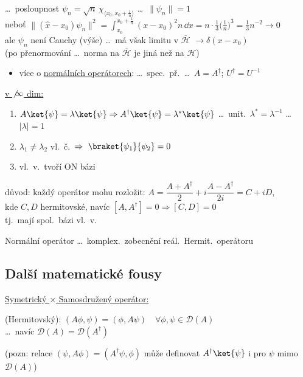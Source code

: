 \begin{priklad}
\dots\ posloupnost \quad $\psi_n = \sqrt n\,\chi_{\langle x_0,x_0+\frac1n\rangle}$ \quad \dots\ $\|\psi_n\| = 1$ \\
neboť \quad $\|(\hat x - x_0)\psi_n\|^2 = \int_{x_0}^{x_0+\frac1n}(x - x_0)^2n\,\dd x = n\cdot\frac13\big(\frac1n\big)^3 = \frac13n^{-2}\to 0$ \\
ale $\psi_n$ není Cauchy (výše) \dots\ má však limitu v $\overline{\mathcal{H}}$ $\to\delta(x - x_0)$ \\
(po přenormování \dots\ norma na $\overline{\mathcal{H}}$ je jiná než na $\mathcal{H}$)
\end{priklad}

\begin{itemize}
  \item více o \underline{normálních operátorech}: \hfill \dots\ spec.\ př.\ \dots\ $A = A^\dagger$; $U^\dagger = U^{-1}$
\end{itemize}
\underline{v $\not\infty$ dim:}
\begin{enumerate}[label=\arabic*),nosep]
  \item $A\ket{\psi} = \lambda\ket{\psi} \Rightarrow A^\dagger\ket{\psi} = \lambda^*\ket{\psi}$ \hfill \dots\ unit.\ $\lambda^* = \lambda^{-1}$ \dots\ $|\lambda| = 1$
  \item $\lambda_1\neq\lambda_2$ vl.\ č.\ $\Rightarrow\ \braket{\psi_1}{\psi_2} = 0$
  \item vl.\ v.\ tvoří ON bázi
\end{enumerate}
důvod: každý operátor mohu rozložit: \quad $A = \dfrac{A + A^\dagger}{2} + i\dfrac{A - A^\dagger}{2i} = C + iD$, \\
\quad kde $C, D$ hermitovské, navíc $[A, A^\dagger] = 0 \Rightarrow [C, D] = 0$ \\
\quad tj.\ mají spol.\ bázi vl.\ v.

Normální operátor \dots\ komplex.\ zobecnění reál.\ Hermit.\ operátoru

\providecommand{\sumint}{\mathop{\textstyle\sum\hspace{-1.05em}\int}}
\subsection*{Další matematické fousy}
\underline{Symetrický $\times$ Samosdružený operátor:}

\begin{definice}
 (Hermitovský): \quad $(A\phi,\psi) = (\phi,A\psi)\quad\forall\phi,\psi\in\mathcal{D}(A)$ \\
 \dots\ navíc \quad $\mathcal{D}(A) = \mathcal{D}(A^\dagger)$
\end{definice}
(pozn: relace $(\psi,A\phi) = (A^\dagger\psi,\phi)$ může definovat $A^\dagger\ket{\psi}$ i pro $\psi$ mimo $\mathcal{D}(A)$)

